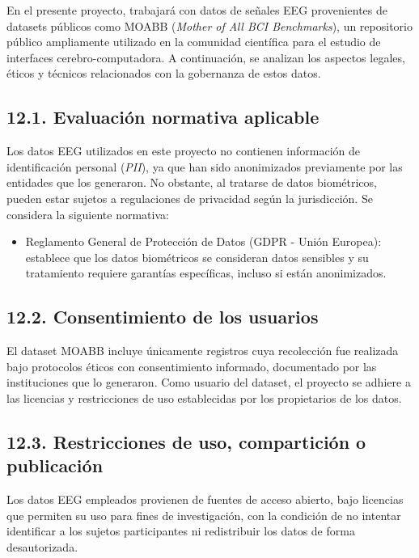\documentclass[
11pt, %
]{charter}
\begin{document}
En el presente proyecto, trabajará con datos de señales EEG provenientes de datasets públicos como MOABB (\textit{Mother of All BCI Benchmarks}), un repositorio público ampliamente utilizado en la comunidad científica para el estudio de interfaces cerebro-computadora. A continuación, se analizan los aspectos legales, éticos y técnicos relacionados con la gobernanza de estos datos.

\subsection*{12.1. Evaluación normativa aplicable}

Los datos EEG utilizados en este proyecto no contienen información de identificación personal (\textit{PII}), ya que han sido anonimizados previamente por las entidades que los generaron. No obstante, al tratarse de datos biométricos, pueden estar sujetos a regulaciones de privacidad según la jurisdicción. Se considera la siguiente normativa:

\begin{itemize}
  \item Reglamento General de Protección de Datos (GDPR - Unión Europea): establece que los datos biométricos se consideran datos sensibles y su tratamiento requiere garantías específicas, incluso si están anonimizados.
\end{itemize}

\subsection*{12.2. Consentimiento de los usuarios}

El dataset MOABB incluye únicamente registros cuya recolección fue realizada bajo protocolos éticos con consentimiento informado, documentado por las instituciones que lo generaron. Como usuario del dataset, el proyecto se adhiere a las licencias y restricciones de uso establecidas por los propietarios de los datos.

\subsection*{12.3. Restricciones de uso, compartición o publicación}

Los datos EEG empleados provienen de fuentes de acceso abierto, bajo licencias que permiten su uso para fines de investigación, con la condición de no intentar identificar a los sujetos participantes ni redistribuir los datos de forma desautorizada.
\end{document}
